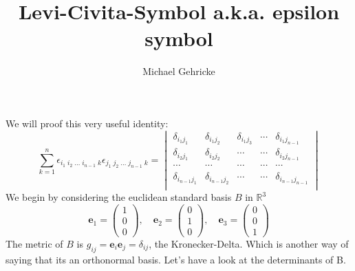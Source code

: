 \documentclass[11pt, oneside]{article}   	%
\title{Levi-Civita-Symbol a.k.a. epsilon symbol}
\author{Michael Gehricke}
\begin{document}
\maketitle
\newcommand{\vect}[1]{\mathbf{#1}}
\newcommand{\tenmix}[3]{{#1}^{#2}_{#3}}
We will proof this very useful identity:
\begin{equation} \label{EpsilonDet}
    \sum_{k=1}^n \epsilon_{i_1\;i_2\;\ldots\; i_{n-1}\; k} \epsilon_{j_1\;j_2\;\ldots\; j_{n-1}\; k}
    =
    \begin{vmatrix}
    \delta_{i_1 j_1} & \delta_{i_1 j_2} & \delta_{i_1 j_3}  & \cdots & \delta_{i_1 j_{n-1}} \\
    \delta_{i_2 j_1} & \delta_{i_2 j_2} & \cdots            & \cdots & \delta_{i_2 j_{n-1}} \\
    \cdots           & \cdots           & \cdots            & \cdots & \cdots               \\
    \delta_{i_{n-1}j_1} & \delta_{i_{n-1} j_2} & \cdots     & \cdots & \delta_{i_{n-1} j_{n-1}} \\
    \end{vmatrix}   
\end{equation}
%
We begin by considering the euclidean standard basis $B$ in $\mathbb{R}^3$
\begin{equation}
    \mathbf{e}_1 = \begin{pmatrix} 1 \\ 0 \\ 0 \end{pmatrix},\quad
    \mathbf{e}_2 = \begin{pmatrix} 0 \\ 1 \\ 0 \end{pmatrix},\quad
    \mathbf{e}_3 = \begin{pmatrix} 0 \\ 0 \\ 1 \end{pmatrix}
\end{equation}
The metric of $B$ is $g_{ij} = \mathbf{e}_i\mathbf{e}_j = \delta_{ij}$, the Kronecker-Delta.
Which is another way of saying that its an orthonormal basis. Let's have a look at the determinants of B.
\end{document}
